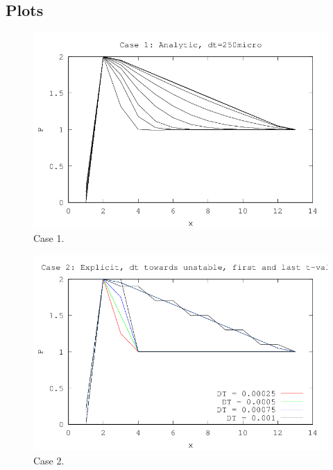 \subsection{Plots} %
\label{sub:plots}

\begin{figure}[H]
  \centering
  \includegraphics[]{../code/case1.png}
  \caption{Case 1.}
  \label{fig:case1}
\end{figure}

\begin{figure}[H]
  \centering
  \includegraphics[]{../code/case2.png}
  \caption{Case 2.}
  \label{fig:case2}
\end{figure}

